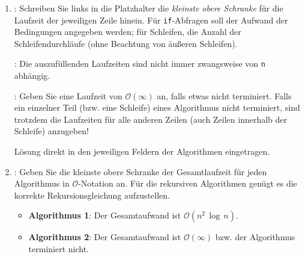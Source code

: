 \documentclass[german]{acAssignment}
\begin{document}
\begin{enumerate}
    \item
        :
        Schreiben Sie links in die Platzhalter die \emph{kleinste obere Schranke} für die Laufzeit der jeweiligen Zeile hinein.
        Für \texttt{if}-Abfragen soll der Aufwand der Bedingungen angegeben werden; für Schleifen, die Anzahl der Schleifendurchläufe (ohne Beachtung von äußeren Schleifen).
    
        \acNote:
        Die auszufüllenden Laufzeiten sind nicht immer zwangsweise von \texttt{n} abhängig.
        
        \acNote:
        Geben Sie eine Laufzeit von $\mathcal{O}(\infty)$ an, falls etwas nicht terminiert.
        Falls ein einzelner Teil (bzw. eine Schleife) eines Algorithmus nicht terminiert, sind trotzdem die Laufzeiten für alle anderen Zeilen (auch Zeilen innerhalb der Schleife) anzugeben!
        
        \begin{acSolution}
            Lösung direkt in den jeweiligen Feldern der Algorithmen eingetragen.
        \end{acSolution}
    
    \item\label{subtask:receq}
        :
        Geben Sie die kleinste obere Schranke der Gesamtlaufzeit für jeden Algorithmus in $\mathcal{O}$-Notation an.
        Für die rekursiven Algorithmen genügt es die korrekte Rekursionsgleichung aufzustellen.
        
        \begin{acSolution}
            \begin{itemize}
                \item\textbf{Algorithmus 1}:
                    Der Gesamtaufwand ist $\mathcal{O}(n^2\,\log\,n)$.
                    
                \item\textbf{Algorithmus 2}:
                    Der Gesamtaufwand ist $\mathcal{O}(\infty)$ bzw. der Algorithmus terminiert nicht.
                    

\end{itemize}
\end{acSolution}
\end{enumerate}
\end{document}
